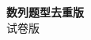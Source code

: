 \documentclass[zihao=-4]{exam-zh}
\begin{document}
\begin{center}
  {\bfseries 数列题型去重版}\\[4pt]
  { 试卷版}
\end{center}

\end{document}
